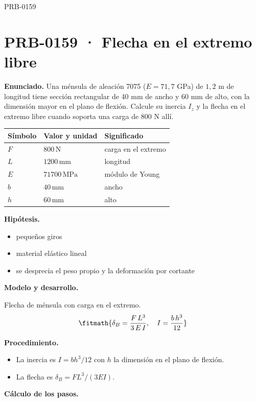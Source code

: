 \begin{studiumworked}{PRB-0159}

\section{PRB-0159 · Flecha en el extremo libre}

\textbf{Enunciado.} Una ménsula de aleación 7075 ($E = 71{,}7$ GPa) de $1{,}2$ m de longitud tiene sección rectangular de 40 mm de ancho y 60 mm de alto, con la dimensión mayor en el plano de flexión. Calcule su inercia $I_z$ y la flecha en el extremo libre cuando soporta una carga de 800 N allí.

\par\medskip\noindent\begin{tabular}{@{}p{.18\linewidth}p{.26\linewidth}p{.48\linewidth}@{}}
\toprule Símbolo & Valor y unidad & Significado\\\midrule
$F$ & $800\,\mathrm{N}$ & carga en el extremo\\
$L$ & $1200\,\mathrm{mm}$ & longitud\\
$E$ & $71700\,\mathrm{MPa}$ & módulo de Young\\
$b$ & $40\,\mathrm{mm}$ & ancho\\
$h$ & $60\,\mathrm{mm}$ & alto\\
\bottomrule\end{tabular}\par\medskip

\textbf{Hipótesis.}\begin{itemize}\item pequeños giros
\item material elástico lineal
\item se desprecia el peso propio y la deformación por cortante\end{itemize}

\textbf{Modelo y desarrollo.}

Flecha de ménsula con carga en el extremo.\[\fitmath{\delta_B = \frac{F\,L^{3}}{3\,E\,I},\quad I = \frac{b\,h^{3}}{12}}\]

\textbf{Procedimiento.}\begin{itemize}\item La inercia es $I = b h^3/12$ con $h$ la dimensión en el plano de flexión.
\item La flecha es $\delta_B = F L^3/(3 E I)$.\end{itemize}

\textbf{Cálculo de los pasos.}


\end{studiumworked}
